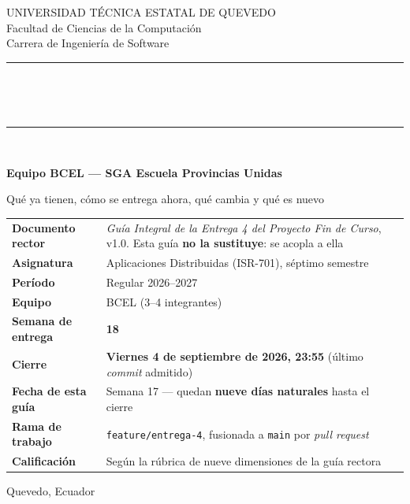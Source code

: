 \documentclass[11pt,a4paper]{article}
\begin{document}
\begin{titlepage}
	\centering
	\vspace*{0.8cm}
	{\small\color{uteqGray} UNIVERSIDAD TÉCNICA ESTATAL DE QUEVEDO\\ Facultad de Ciencias de la Computación\\ Carrera de Ingeniería de Software\par}
	\vspace{14pt}
	{\color{uteqBlue}\rule{\textwidth}{2pt}}\\[7pt]
	\colorbox{uteqBlue}{\parbox{0.96\textwidth}{\centering{}\vspace{5pt}}}\\[7pt]
	{\color{uteqBlue}\rule{\textwidth}{2pt}}\\[16pt]
	{\LARGE\bfseries\color{uteqBlue} Equipo BCEL --- SGA Escuela Provincias Unidas\par}
	\vspace{5pt}
	{\large\color{uteqGray} Qué ya tienen, cómo se entrega ahora, qué cambia y qué es nuevo\par}
	\vspace{20pt}
	\begin{minipage}{0.93\textwidth}
		\small
		\begin{tabular}{@{}p{4.6cm}p{9.8cm}@{}}
			\toprule
			\textbf{Documento rector} & \emph{Guía Integral de la Entrega 4 del Proyecto Fin de Curso}, v1.0. Esta guía \textbf{no la sustituye}: se acopla a ella \\
			\textbf{Asignatura} & Aplicaciones Distribuidas (ISR-701), séptimo semestre \\
			\textbf{Período} & Regular 2026--2027 \\
			\textbf{Equipo} & BCEL (3--4 integrantes) \\
			\textbf{Semana de entrega} & \textbf{18} \\
			\textbf{Cierre} & \textbf{Viernes 4 de septiembre de 2026, 23:55} (último \emph{commit} admitido) \\
			\textbf{Fecha de esta guía} & Semana 17 --- quedan \textbf{nueve días naturales} hasta el cierre \\
			\textbf{Rama de trabajo} & \texttt{feature/entrega-4}, fusionada a \texttt{main} por \emph{pull request} \\
			\textbf{Calificación} & Según la rúbrica de nueve dimensiones de la guía rectora \\
			\bottomrule
		\end{tabular}
	\end{minipage}
	\vfill
	{\small\color{uteqGray} Quevedo, Ecuador\par}
\end{titlepage}
\end{document}
